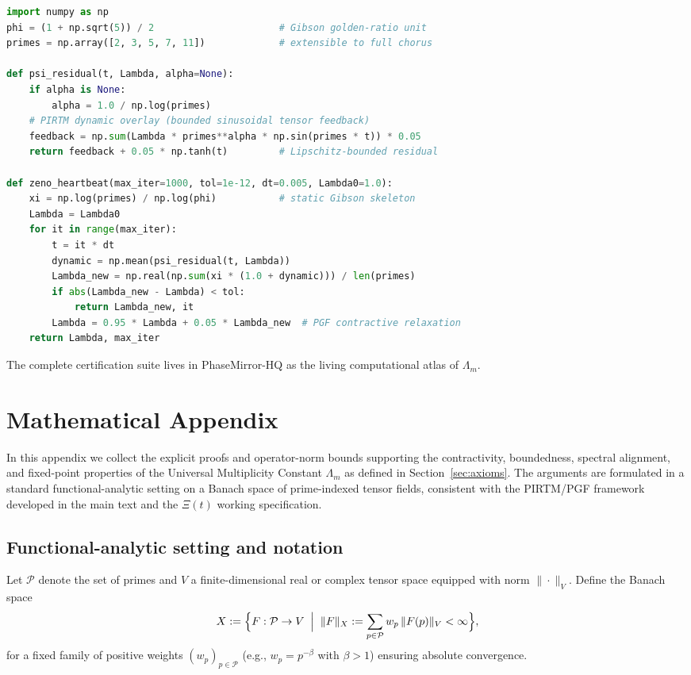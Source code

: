 \documentclass[11pt, a4paper]{article}
\begin{document}
\begin{lstlisting}[language=Python, caption={Zeno-Heartbeat Fixed-Point Iteration (PhaseMirror-HQ Core)}]
import numpy as np
phi = (1 + np.sqrt(5)) / 2                      # Gibson golden-ratio unit
primes = np.array([2, 3, 5, 7, 11])             # extensible to full chorus

def psi_residual(t, Lambda, alpha=None):
    if alpha is None:
        alpha = 1.0 / np.log(primes)
    # PIRTM dynamic overlay (bounded sinusoidal tensor feedback)
    feedback = np.sum(Lambda * primes**alpha * np.sin(primes * t)) * 0.05
    return feedback + 0.05 * np.tanh(t)         # Lipschitz-bounded residual

def zeno_heartbeat(max_iter=1000, tol=1e-12, dt=0.005, Lambda0=1.0):
    xi = np.log(primes) / np.log(phi)           # static Gibson skeleton
    Lambda = Lambda0
    for it in range(max_iter):
        t = it * dt
        dynamic = np.mean(psi_residual(t, Lambda))
        Lambda_new = np.real(np.sum(xi * (1.0 + dynamic))) / len(primes)
        if abs(Lambda_new - Lambda) < tol:
            return Lambda_new, it
        Lambda = 0.95 * Lambda + 0.05 * Lambda_new  # PGF contractive relaxation
    return Lambda, max_iter
\end{lstlisting}

The complete certification suite lives in PhaseMirror-HQ as the living computational atlas of \(\Lambda_m\).

\section*{Mathematical Appendix}

In this appendix we collect the explicit proofs and operator-norm bounds supporting the contractivity, boundedness, spectral alignment, and fixed-point properties of the Universal Multiplicity Constant \(\Lambda_m\) as defined in Section~\ref{sec:axioms}. The arguments are formulated in a standard functional-analytic setting on a Banach space of prime-indexed tensor fields, consistent with the PIRTM/PGF framework developed in the main text and the \(\Xi(t)\) working specification.

\subsection{Functional-analytic setting and notation}

Let \(\mathcal{P}\) denote the set of primes and \(V\) a finite-dimensional real or complex tensor space equipped with norm \(\|\cdot\|_V\). Define the Banach space
\[
X := \Bigl\{ F : \mathcal{P} \to V \;\Bigm|\;
\|F\|_X := \sum_{p \in \mathcal{P}} w_p \,\|F(p)\|_V < \infty \Bigr\},
\]
for a fixed family of positive weights \((w_p)_{p \in \mathcal{P}}\) (e.g., \(w_p = p^{-\beta}\) with \(\beta > 1\)) ensuring absolute convergence.
\end{document}
